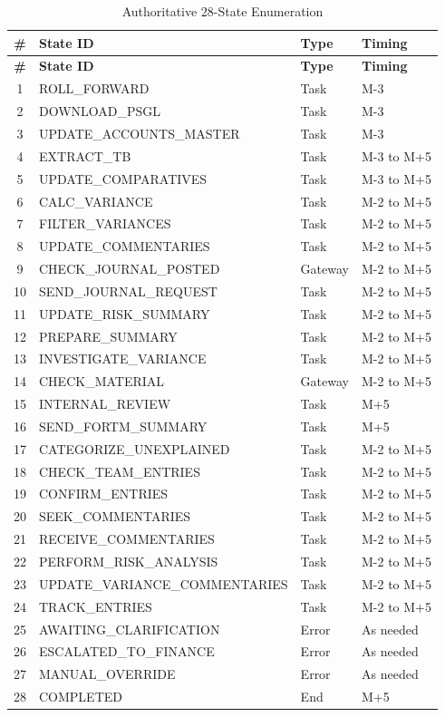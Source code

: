 \begin{longtable}{clll}
\caption{Authoritative 28-State Enumeration} \\
\toprule
\textbf{\#} & \textbf{State ID} & \textbf{Type} & \textbf{Timing} \\
\midrule
\endfirsthead
\toprule
\textbf{\#} & \textbf{State ID} & \textbf{Type} & \textbf{Timing} \\
\midrule
\endhead
1 & ROLL\_FORWARD & Task & M-3 \\
2 & DOWNLOAD\_PSGL & Task & M-3 \\
3 & UPDATE\_ACCOUNTS\_MASTER & Task & M-3 \\
4 & EXTRACT\_TB & Task & M-3 to M+5 \\
5 & UPDATE\_COMPARATIVES & Task & M-3 to M+5 \\
6 & CALC\_VARIANCE & Task & M-2 to M+5 \\
7 & FILTER\_VARIANCES & Task & M-2 to M+5 \\
8 & UPDATE\_COMMENTARIES & Task & M-2 to M+5 \\
9 & CHECK\_JOURNAL\_POSTED & Gateway & M-2 to M+5 \\
10 & SEND\_JOURNAL\_REQUEST & Task & M-2 to M+5 \\
11 & UPDATE\_RISK\_SUMMARY & Task & M-2 to M+5 \\
12 & PREPARE\_SUMMARY & Task & M-2 to M+5 \\
13 & INVESTIGATE\_VARIANCE & Task & M-2 to M+5 \\
14 & CHECK\_MATERIAL & Gateway & M-2 to M+5 \\
15 & INTERNAL\_REVIEW & Task & M+5 \\
16 & SEND\_FORTM\_SUMMARY & Task & M+5 \\
17 & CATEGORIZE\_UNEXPLAINED & Task & M-2 to M+5 \\
18 & CHECK\_TEAM\_ENTRIES & Task & M-2 to M+5 \\
19 & CONFIRM\_ENTRIES & Task & M-2 to M+5 \\
20 & SEEK\_COMMENTARIES & Task & M-2 to M+5 \\
21 & RECEIVE\_COMMENTARIES & Task & M-2 to M+5 \\
22 & PERFORM\_RISK\_ANALYSIS & Task & M-2 to M+5 \\
23 & UPDATE\_VARIANCE\_COMMENTARIES & Task & M-2 to M+5 \\
24 & TRACK\_ENTRIES & Task & M-2 to M+5 \\
25 & AWAITING\_CLARIFICATION & Error & As needed \\
26 & ESCALATED\_TO\_FINANCE & Error & As needed \\
27 & MANUAL\_OVERRIDE & Error & As needed \\
28 & COMPLETED & End & M+5 \\
\bottomrule
\end{longtable}

